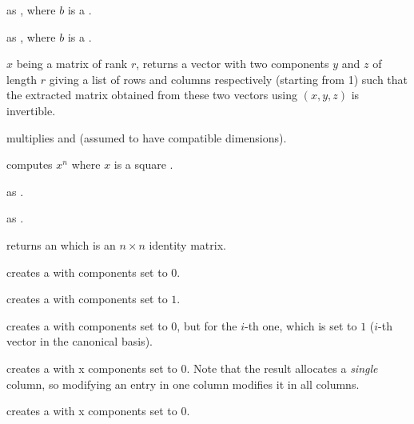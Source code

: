 
as , where $b$ is a .

as , where $b$ is a .


 $x$ being a matrix of rank $r$, returns a
vector with two  components $y$ and $z$ of length $r$ giving a
list of rows and columns respectively (starting from 1) such that the extracted
matrix obtained from these two vectors using $(x,y,z)$ is
invertible.

 multiplies   and  (assumed to
have compatible dimensions).

 computes $x^n$ where $x$ is a square
.

 as .

 as .

 returns an  which is an $n \times n$
identity matrix.

 creates a  with  components set to
$0$.

 creates a  with  components set to
$1$.

 creates a  with  components
set to $0$, but for the $i$-th one, which is set to $1$ ($i$-th vector in the
canonical basis).

 creates a  with  x 
components set to $0$. Note that the result allocates a
\emph{single} column, so modifying an entry in one column modifies it in
all columns.

 creates a  with  x
 components set to $0$.









